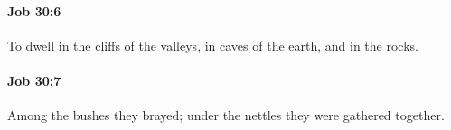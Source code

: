 		\paragraph{Job 30:6} %
			\label{JOB-30-6}

			To dwell in the cliffs of the valleys, in caves of the earth, and in the rocks.


		\paragraph{Job 30:7} %
			\label{JOB-30-7}

			Among the bushes they brayed; under the nettles they were gathered together.


